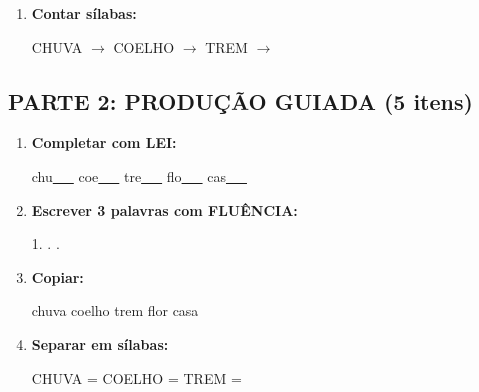 \begin{exercicio}
\begin{enumerate}
  \item \textbf{Contar sílabas:}
  \begin{center}
  CHUVA $\rightarrow$ \underline{\hspace{0.9cm}} \quad COELHO $\rightarrow$ \underline{\hspace{0.9cm}} \quad TREM $\rightarrow$ \underline{\hspace{0.9cm}}
  \end{center}

\end{enumerate}

\subsection*{PARTE 2: PRODUÇÃO GUIADA (5 itens)}

\begin{enumerate}[resume]

  \item \textbf{Completar com LEI:}
  \begin{center}
  chu\underline{~~~} \quad coe\underline{~~~} \quad tre\underline{~~~} \quad flo\underline{~~~} \quad cas\underline{~~~}
  \end{center}

  \item \textbf{Escrever 3 palavras com FLUÊNCIA:}
  \begin{center}
  1. \underline{\hspace{3cm}} . \underline{\hspace{3cm}} . \underline{\hspace{3cm}}
  \end{center}

  \item \textbf{Copiar:}
  \begin{center}
  chuva \quad coelho \quad trem \quad flor \quad casa
  \end{center}

  \item \textbf{Separar em sílabas:}
  \begin{center}
  CHUVA = \underline{\hspace{1cm}} \underline{\hspace{1cm}} \quad COELHO = \underline{\hspace{1cm}} \underline{\hspace{1cm}} \quad TREM = \underline{\hspace{1cm}} \underline{\hspace{1cm}}
  \end{center}


\end{enumerate}
\end{exercicio}
